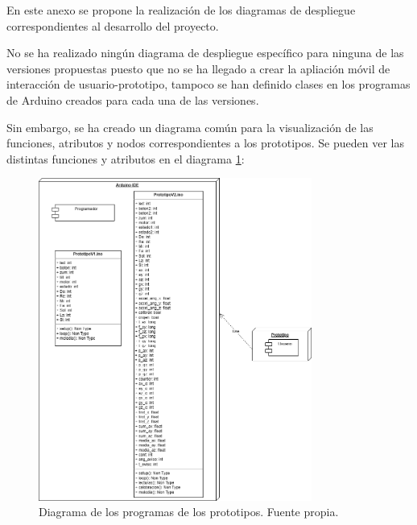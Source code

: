 En este anexo se propone la realización de los diagramas de despliegue correspondientes al desarrollo del proyecto.

No se ha realizado ningún diagrama de despliegue específico para ninguna de las versiones propuestas puesto que no se ha llegado a crear la apliación móvil de interacción de usuario-prototipo, tampoco se han definido clases en los programas de Arduino\cite{ArduinoIDE} creados para cada una de las versiones. 

Sin embargo, se ha creado un diagrama común para la visualización de las funciones, atributos y nodos correspondientes a los prototipos. Se pueden ver las distintas funciones y atributos en el diagrama \ref{fig:digDespliegue}:

\begin{figure}[h]
    \centering
    \includegraphics[width=0.8\textwidth]{img/DiagramDespliegue.png}
    \caption{Diagrama de los programas de los prototipos. Fuente propia.}
    \label{fig:digDespliegue} 
\end{figure}


